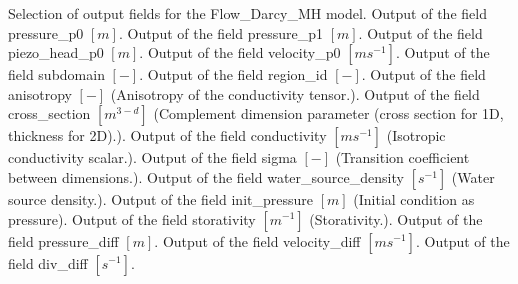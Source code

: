 \begin{SelectionType}
	{}
	{{{Selection of output fields for the Flow{\_}Darcy{\_}MH model.}}}
		\KeyItem
			{}
			{{{Output of the field pressure{\_}p0 }{$[m]$}{.}}}
		\KeyItem
			{}
			{{{Output of the field pressure{\_}p1 }{$[m]$}{.}}}
		\KeyItem
			{}
			{{{Output of the field piezo{\_}head{\_}p0 }{$[m]$}{.}}}
		\KeyItem
			{}
			{{{Output of the field velocity{\_}p0 }{$[ms^{-1}]$}{.}}}
		\KeyItem
			{}
			{{{Output of the field subdomain }{$[-]$}{.}}}
		\KeyItem
			{}
			{{{Output of the field region{\_}id }{$[-]$}{.}}}
		\KeyItem
			{}
			{{{Output of the field anisotropy }{$[-]$}{ (Anisotropy of the conductivity tensor.).}}}
		\KeyItem
			{}
			{{{Output of the field cross{\_}section }{$[m^{3-d}]$}{ (Complement dimension parameter (cross section for 1D, thickness for 2D).).}}}
		\KeyItem
			{}
			{{{Output of the field conductivity }{$[ms^{-1}]$}{ (Isotropic conductivity scalar.).}}}
		\KeyItem
			{}
			{{{Output of the field sigma }{$[-]$}{ (Transition coefficient between dimensions.).}}}
		\KeyItem
			{}
			{{{Output of the field water{\_}source{\_}density }{$[s^{-1}]$}{ (Water source density.).}}}
		\KeyItem
			{}
			{{{Output of the field init{\_}pressure }{$[m]$}{ (Initial condition as pressure).}}}
		\KeyItem
			{}
			{{{Output of the field storativity }{$[m^{-1}]$}{ (Storativity.).}}}
		\KeyItem
			{}
			{{{Output of the field pressure{\_}diff }{$[m]$}{.}}}
		\KeyItem
			{}
			{{{Output of the field velocity{\_}diff }{$[ms^{-1}]$}{.}}}
		\KeyItem
			{}
			{{{Output of the field div{\_}diff }{$[s^{-1}]$}{.}}}
\end{SelectionType}
